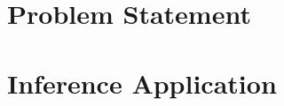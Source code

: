 \begin{appendix}
  \chapter{Problem Statement}
  \label{app:problem_statement}
  

  \chapter{Inference Application}
  \label{app:inference_application}
  
\end{appendix}
